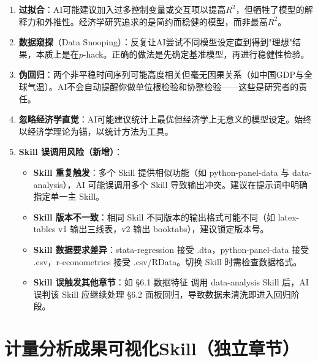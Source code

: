 \begin{warningbox}
\begin{enumerate}[leftmargin=2em]
  \item \textbf{过拟合}：AI可能建议加入过多控制变量或交互项以提高$R^2$，但牺牲了模型的解释力和外推性。经济学研究追求的是简约而稳健的模型，而非最高$R^2$。

  \item \textbf{数据窥探}（Data Snooping）：反复让AI尝试不同模型设定直到得到"理想"结果，本质上是在$p$-hack。正确的做法是先确定基准模型，再进行稳健性检验。

  \item \textbf{伪回归}：两个非平稳时间序列可能高度相关但毫无因果关系（如中国GDP与全球气温）。AI不会自动提醒你做单位根检验和协整检验——这些是研究者的责任。

  \item \textbf{忽略经济学直觉}：AI可能建议统计上最优但经济学上无意义的模型设定。始终以经济学理论为锚，以统计方法为工具。

  \item \textbf{Skill 误调用风险（新增）}：
    \begin{itemize}
      \item \textbf{Skill 重复触发}：多个 Skill 提供相似功能（如 python-panel-data 与 data-analysis），AI 可能误调用多个 Skill 导致输出冲突。建议在提示词中明确指定单一主 Skill。
      \item \textbf{Skill 版本不一致}：相同 Skill 不同版本的输出格式可能不同（如 latex-tables v1 输出三线表，v2 输出 booktabs），建议锁定版本号。
      \item \textbf{Skill 数据要求差异}：stata-regression 接受 .dta，python-panel-data 接受 .csv，r-econometrics 接受 .csv/RData。切换 Skill 时需检查数据格式。
      \item \textbf{Skill 误触发其他章节}：如 §6.1 数据特征 调用 data-analysis Skill 后，AI 误判该 Skill 应继续处理 §6.2 面板回归，导致数据未清洗即进入回归阶段。
    \end{itemize}
\end{enumerate}
\end{warningbox}

\section{计量分析成果可视化Skill（独立章节）}


